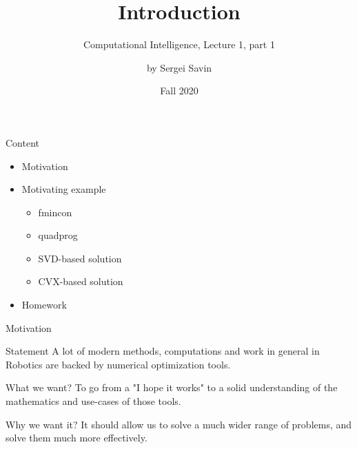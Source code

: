 \documentclass{beamer}
\title{Introduction}
\subtitle{Computational Intelligence, Lecture 1, part 1}
\author{by Sergei Savin}
\date{Fall 2020}
\begin{document}
\maketitle


\begin{frame}{Content}

\begin{itemize}
\item Motivation
\item Motivating example
\begin{itemize}
\item fmincon
\item quadprog
\item SVD-based solution
\item CVX-based solution
\end{itemize}
\item Homework
\end{itemize}

\end{frame}



\begin{frame}{Motivation}
\begin{flushleft}

\begin{block}{Statement}
  A lot of modern methods, computations and work in general in Robotics are backed by numerical optimization tools.
\end{block}

\begin{block}{What we want?}
  To go from a "I hope it works" to a solid understanding of the mathematics and use-cases of those tools.
\end{block}

\begin{block}{Why we want it?}
  It should allow us to solve a much wider range of problems, and solve them much more effectively.
\end{block}

\end{flushleft}
\end{frame}
\end{document}
